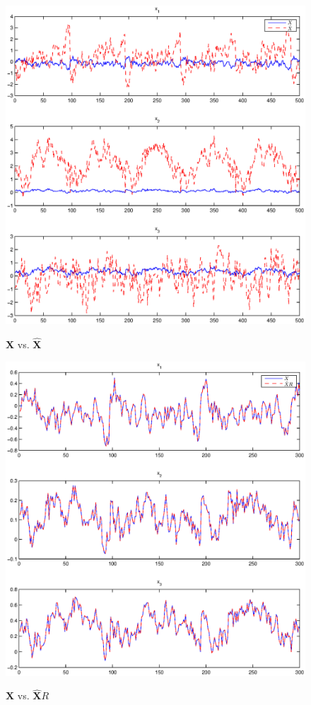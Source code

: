 \documentclass[12pt]{article}
\begin{document}
\begin{figure}[ht]
\begin{center}
\includegraphics[width=4.5in]{statecompare1.eps}\\
\caption{$\mathbf{X}$ vs. $\hat{\mathbf{X}}$}
\label{fig:statecompare1}
\end{center}
\end{figure}

\begin{figure}[ht]
\begin{center}
\includegraphics[width=4.5in]{statecompare2.eps}\\
\caption{$\mathbf{X}$ vs. $\hat{\mathbf{X}}R$}
\label{fig:statecompare2}
\end{center}
\end{figure}
\end{document}
